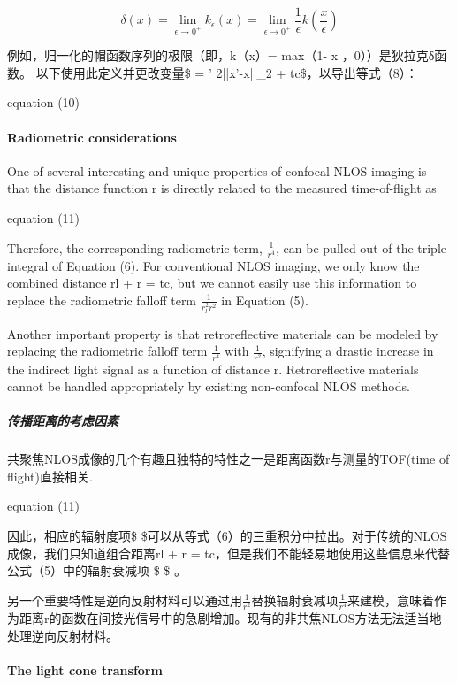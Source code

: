 \documentclass[11pt]{article}
\begin{document}
\[\delta(x)=\lim_{\epsilon \to 0^{+}}k_{\epsilon}(x)=\lim_{\epsilon \to 0^{+}}\frac{1}{\epsilon}k(\frac{x}{\epsilon})\]

例如，归一化的帽函数序列的极限（即，k（x）= max（1- \textbar{} x
\textbar{}，0））是狄拉克δ函数。 以下使用此定义并更改变量\$ \epsilon =
\epsilon'  {2||x'-x||_{2} + tc}\$，以导出等式（8）：

 equation (10)

    \paragraph{Radiometric considerations}\label{radiometric-considerations}

One of several interesting and unique properties of confocal NLOS
imaging is that the distance function r is directly related to the
measured time-of-flight as

 equation (11)

Therefore, the corresponding radiometric term, \(\frac{1}{r^{4}}\), can
be pulled out of the triple integral of Equation (6). For conventional
NLOS imaging, we only know the combined distance rl + r = tc, but we
cannot easily use this information to replace the radiometric falloff
term \(\frac{1}{r_{l}^{2}r^{2}}\) in Equation (5).

Another important property is that retroreflective materials can be
modeled by replacing the radiometric falloff term \(\frac{1}{r^{4}}\)
with \(\frac{1}{r^{2}}\), signifying a drastic increase in the indirect
light signal as a function of distance r. Retroreflective materials
cannot be handled appropriately by existing non-confocal NLOS methods.

    \subparagraph{传播距离的考虑因素}\label{ux4f20ux64adux8dddux79bbux7684ux8003ux8651ux56e0ux7d20}

共聚焦NLOS成像的几个有趣且独特的特性之一是距离函数r与测量的TOF(time of
flight)直接相关.

 equation (11)

因此，相应的辐射度项\$ 
\$可以从等式（6）的三重积分中拉出。对于传统的NLOS成像，我们只知道组合距离rl
+ r = tc，但是我们不能轻易地使用这些信息来代替公式（5）中的辐射衰减项 \$
\$ 。

另一个重要特性是逆向反射材料可以通过用\(\frac{1}{r^{2}}\)替换辐射衰减项\(\frac{1}{r^{4}}\)来建模，意味着作为距离r的函数在间接光信号中的急剧增加。现有的非共焦NLOS方法无法适当地处理逆向反射材料。

    \paragraph{The light cone transform}\label{the-light-cone-transform}
\end{document}
